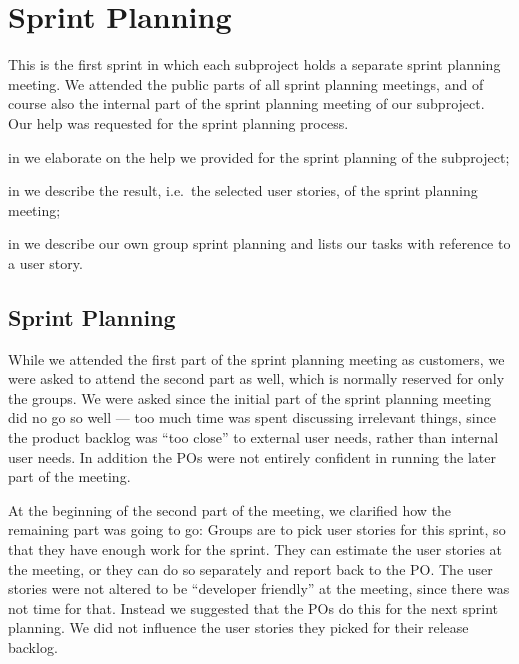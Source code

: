 \chapter{Sprint Planning}\label{chap:s2_sprintplanning}
This is the first sprint in which each subproject holds a separate sprint planning meeting. We attended the public parts of all sprint planning meetings, and of course also the internal part of the sprint planning meeting of our subproject. Our help was requested for the \db sprint planning process.

\begin{chapterorganization}
  \item in  we elaborate on the help we provided for the sprint planning of the \db subproject;
  \item in  we describe the result, i.e.\ the selected user stories, of the \bd sprint planning meeting;
  \item in  we describe our own group sprint planning and lists our tasks with reference to a user story.
\end{chapterorganization}


\section{\dbtitle Sprint Planning}\label{sec:S2_db}
While we attended the first part of the \db sprint planning meeting as customers, we were asked to attend the second part as well, which is normally reserved for only the \db groups. We were asked since the initial part of the sprint planning meeting did no go so well --- too much time was spent discussing irrelevant things, since the product backlog was ``too close'' to external user needs, rather than internal user needs. In addition the \db POs were not entirely confident in running the later part of the meeting.

At the beginning of the second part of the meeting, we clarified how the remaining part was going to go: Groups are to pick user stories for this sprint, so that they have enough work for the sprint. They can estimate the user stories at the meeting, or they can do so separately and report back to the PO. The user stories were not altered to be ``developer friendly'' at the meeting, since there was not time for that. Instead we suggested that the POs do this for the next sprint planning. We did not influence the user stories they picked for their release backlog.

